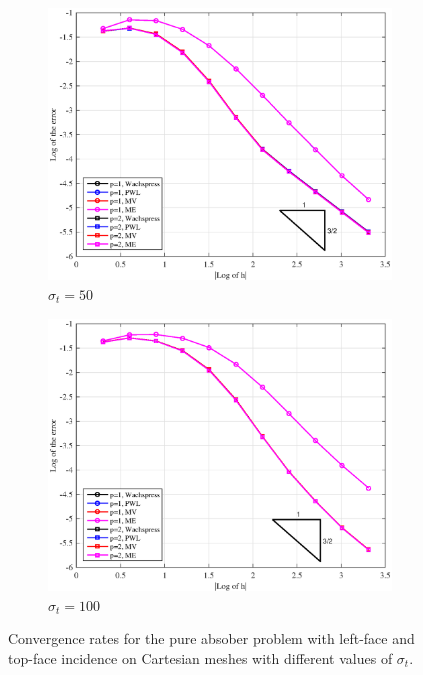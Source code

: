 \begin{figure}
{}
\vspace{1cm}
{
	\begin{subfigure}[b]{0.485\textwidth}
		\centering
		\label{subfig::PA_LeftTop_Cart_sig50}
		\includegraphics[width=\textwidth]{figures/sec_BF/PAErr_LeftTop_Cart_sig50.eps}
	\caption{$\sigma_t = 50$}
	\end{subfigure}
	\hfill
	\begin{subfigure}[b]{0.485\textwidth}
		\centering
		\label{subfig::PA_LeftTop_Cart_sig100}
		\includegraphics[width=\textwidth]{figures/sec_BF/PAErr_LeftTop_Cart_sig100.eps}
	\caption{$\sigma_t = 100$}
	\end{subfigure}
}
\caption{Convergence rates for the pure absober problem with left-face and top-face incidence on Cartesian meshes with different values of $\sigma_t$.}
\label{fig::BF_Results_PA_LeftTop_Cart}
\end{figure}

